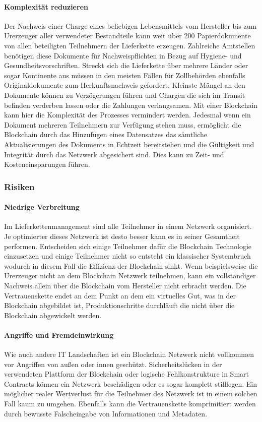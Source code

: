 \paragraph{Komplexität reduzieren}
Der Nachweis einer Charge eines beliebigen Lebensmittels vom Hersteller bis zum Urerzeuger aller verwendeter Bestandteile kann weit über 200 Papierdokumente von allen beteiligten Teilnehmern der Lieferkette erzeugen. Zahlreiche Amtstellen benötigen diese Dokumente für Nachweispflichten in Bezug auf Hygiene- und Gesundheitsvorschriften. Streckt sich die Lieferkette über mehrere Länder oder sogar Kontinente aus müssen in den meisten Fällen für Zollbehörden ebenfalls Originaldokumente zum Herkunftsnachweis gefordert. Kleinste Mängel an den Dokumente können zu Verzögerungen führen und Chargen die sich im Transit befinden verderben lassen oder die Zahlungen verlangsamen. Mit einer Blockchain kann hier die Komplexität des Prozesses vermindert werden. Jedesmal wenn ein Dokument mehreren Teilnehmern zur Verfügung stehen muss, ermöglicht die Blockchain durch das Hinzufügen eines Datensatzes das sämtliche Aktualisierungen des Dokuments in Echtzeit bereitstehen und die Gültigkeit und Integrität durch das Netzwerk abgesichert sind. Dies kann zu Zeit- und Kosteneinsparungen führen.

\subsubsection{Risiken}
\paragraph{Niedrige Verbreitung}
Im Lieferkettenmanagement sind alle Teilnehmer in einem Netzwerk organisiert. Je optimierter dieses Netzwerk ist desto besser kann es in seiner Gesamtheit performen. Entscheiden sich einige Teilnehmer dafür die Blockchain Technologie einzusetzen und einige Teilnehmer nicht so entsteht ein klassischer Systembruch wodurch in diesem Fall die Effizienz der Blockchain sinkt. Wenn beispielsweise die Urerzeuger nicht an dem Blockchain Netzwerk teilnehmen, kann ein vollständiger Nachweis allein über die Blockchain vom Hersteller nicht erbracht werden. Die Vertrauenskette endet an dem Punkt an dem ein virtuelles Gut, was in der Blockchain abgebildet ist, Produktionschritte durchläuft die nicht über die Blockchain abgewickelt werden. 

\paragraph{Angriffe und Fremdeinwirkung}
Wie auch andere IT Landschaften ist ein Blockchain Netzwerk nicht vollkommen vor Angriffen von außen oder innen geschützt. Sicherheitslücken in der verwendeten Plattform der Blockchain oder logische Fehlkonstrukture in Smart Contracts können ein Netzwerk beschädigen oder es sogar komplett stilllegen. Ein möglicher realer Wertverlust für die Teilnehmer des Netzwerk ist in einem solchen Fall kaum zu umgehen. Ebenfalls kann die Vertrauenskette komprimitiert werden durch bewusste Falscheingabe von Informationen und Metadaten. 

